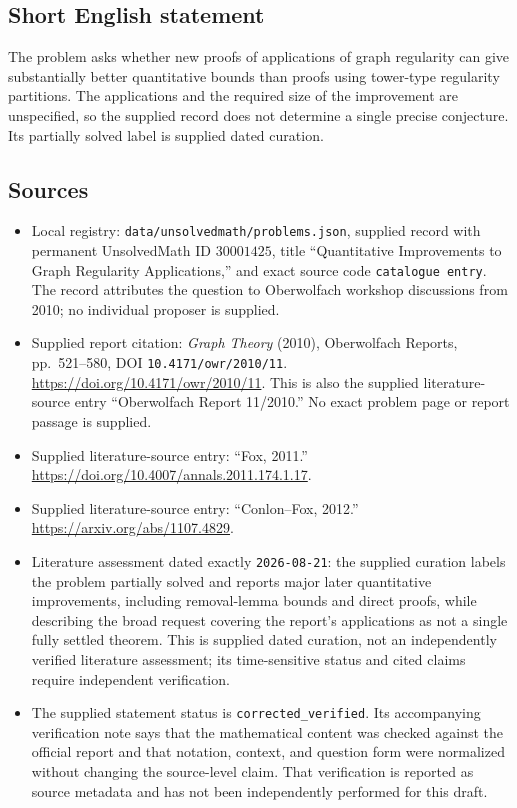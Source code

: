 \documentclass[11pt]{article}
\begin{document}
\subsection{Short English statement}
The problem asks whether new proofs of applications of graph regularity can give substantially better quantitative bounds than proofs using tower-type regularity partitions. The applications and the required size of the improvement are unspecified, so the supplied record does not determine a single precise conjecture. Its partially solved label is supplied dated curation.
\subsection{Sources}
\begin{itemize}
\item Local registry: \texttt{data/unsolvedmath/problems.json}, supplied record with permanent UnsolvedMath ID \(30001425\), title ``Quantitative Improvements to Graph Regularity Applications,'' and exact source code \texttt{catalogue entry}. The record attributes the question to Oberwolfach workshop discussions from 2010; no individual proposer is supplied.
\item Supplied report citation: \emph{Graph Theory} (2010), Oberwolfach Reports, pp.~521--580, DOI \texttt{10.4171/owr/2010/11}. \url{https://doi.org/10.4171/owr/2010/11}. This is also the supplied literature-source entry ``Oberwolfach Report 11/2010.'' No exact problem page or report passage is supplied.
\item Supplied literature-source entry: ``Fox, 2011.'' \url{https://doi.org/10.4007/annals.2011.174.1.17}.
\item Supplied literature-source entry: ``Conlon--Fox, 2012.'' \url{https://arxiv.org/abs/1107.4829}.
\item Literature assessment dated exactly \texttt{2026-08-21}: the supplied curation labels the problem partially solved and reports major later quantitative improvements, including removal-lemma bounds and direct proofs, while describing the broad request covering the report's applications as not a single fully settled theorem. This is supplied dated curation, not an independently verified literature assessment; its time-sensitive status and cited claims require independent verification.
\item The supplied statement status is \texttt{corrected\_verified}. Its accompanying verification note says that the mathematical content was checked against the official report and that notation, context, and question form were normalized without changing the source-level claim. That verification is reported as source metadata and has not been independently performed for this draft.
\end{itemize}
\end{document}
